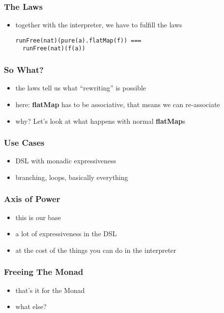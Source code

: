 \documentclass{beamer}
\begin{document}
\begin{frame}[fragile]
  \frametitle{The Laws}
  \begin{itemize}
  \item together with the interpreter, we have to fulfill the laws
    \begin{verbatim}
runFree(nat)(pure(a).flatMap(f)) ===
  runFree(nat)(f(a))
    \end{verbatim}
  \end{itemize}
\end{frame}

\begin{frame}
  \frametitle{So What?}
  \begin{itemize}
  \item the laws tell us what ``rewriting'' is possible
  \item here: \textbf{flatMap} has to be associative, that means we can re-associate
  \item why? Let's look at what happens with normal \textbf{flatMap}s
  \end{itemize}
\end{frame}

\begin{frame}
  \frametitle{Use Cases}
  \begin{itemize}
  \item DSL with monadic expressiveness
  \item branching, loops, basically everything
  \end{itemize}
\end{frame}

\begin{frame}
  \frametitle{Axis of Power}
  \begin{itemize}
  \item this is our base
  \item a lot of expressiveness in the DSL
  \item at the cost of the things you can do in the interpreter
  \end{itemize}
\end{frame}

\begin{frame}
  \frametitle{Freeing The Monad}
  \begin{itemize}
  \item that's it for the Monad
  \item what else?
  \end{itemize}
\end{frame}
\end{document}
